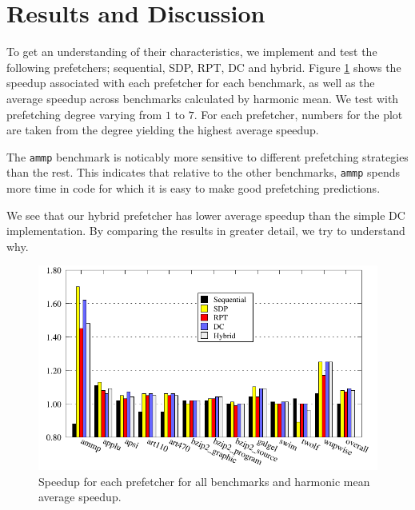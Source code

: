 \section{Results and Discussion}
\label{sec:results-and-discussion}

To get an understanding of their characteristics, we implement and
test the following prefetchers; sequential, SDP, RPT, DC and hybrid.
Figure \ref{fig:comparison} shows the speedup associated with each
prefetcher for each benchmark, as well as the average speedup across
benchmarks calculated by harmonic mean. We test with prefetching
degree varying from $1$ to $7$. For each prefetcher, numbers for the
plot are taken from the degree yielding the highest average speedup.

The \texttt{ammp} benchmark is noticably more sensitive to different
prefetching strategies than the rest. This indicates that relative to
the other benchmarks, \texttt{ammp} spends more time in code for which
it is easy to make good prefetching predictions.

We see that our hybrid prefetcher has lower average speedup than the
simple DC implementation.  By comparing the results in greater detail,
we try to understand why.

\begin{figure}
  \centering
  \includegraphics{plots/overview_speedup.pdf}
  \caption{Speedup for each prefetcher for all benchmarks and harmonic mean average speedup.}
  \label{fig:comparison}
\end{figure}


